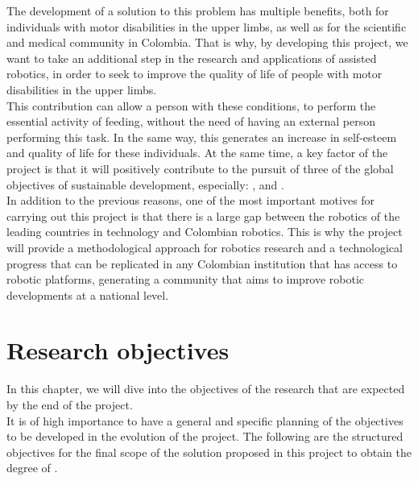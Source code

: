 \documentclass[11pt]{report} %
\begin{document}
The development of a solution to this problem has multiple benefits, both for individuals with motor disabilities in the upper limbs, as well as for the scientific and medical community in Colombia. That is why, by developing this project, we want to take an additional step in the research and applications of assisted robotics, in order to seek to improve the quality of life of people with motor disabilities in the upper limbs.\\

This contribution can allow a person with these conditions, to perform the essential activity of feeding, without the need of having an external person performing this task. In the same way, this generates an increase in self-esteem and quality of life for these individuals.
At the same time, a key factor of the project is that it will positively contribute to the pursuit of three of the global objectives of sustainable development, especially: ,  and  \citep{cite_united_nations_sustainable_development}.\\

In addition to the previous reasons, one of the most important motives for carrying out this project is that there is a large gap between the robotics of the leading countries in technology and Colombian robotics. This is why the project will provide a methodological approach for robotics research and a technological progress that can be replicated in any Colombian institution that has access to robotic platforms, generating a community that aims to improve robotic developments at a national level.\\



\newpage

\section{Research objectives}

In this chapter, we will dive into the objectives of the research that are expected by the end of the project.\\

It is of high importance to have a general and specific planning of the objectives to be developed in the evolution of the project. The following are the structured objectives for the final scope of the solution proposed in this project to obtain the degree of .\\
\end{document}
